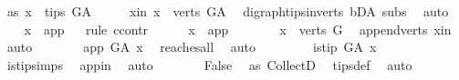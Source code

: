 \begin{isabellebody}
\ as{}{\isacharcolon}{\kern0pt}\ {\isachardoublequoteopen}x\ {\isasymin}\ tips\ G{\isacharunderscore}{\kern0pt}A{\isachardoublequoteclose}\isanewline
\ \ \isamarkupfalse%
\ \isamarkupfalse%
\ x{\isacharunderscore}{\kern0pt}in{\isacharcolon}{\kern0pt}\ {\isachardoublequoteopen}x\ {\isasymin}\ verts\ G{\isacharunderscore}{\kern0pt}A{\isachardoublequoteclose}\ \isamarkupfalse%
\ digraph{\isachardot}{\kern0pt}tips{\isacharunderscore}{\kern0pt}in{\isacharunderscore}{\kern0pt}verts\ bD{\isacharunderscore}{\kern0pt}A\ subs\ \isamarkupfalse%
\ auto\ \isanewline
\ \ \isamarkupfalse%
\ {\isachardoublequoteopen}x\ {\isacharequal}{\kern0pt}\ app{\isachardoublequoteclose}\isanewline
\ \ \isamarkupfalse%
{\isacharparenleft}{\kern0pt}rule\ ccontr{\isacharparenright}{\kern0pt}\isanewline
\ \ \ \ \isamarkupfalse%
\ {\isachardoublequoteopen}x\ {\isasymnoteq}\ app{\isachardoublequoteclose}\isanewline
\ \ \ \ \isamarkupfalse%
\ \isamarkupfalse%
\ {\isachardoublequoteopen}x\ {\isasymin}\ verts\ G{\isachardoublequoteclose}\ \isamarkupfalse%
\ append{\isacharunderscore}{\kern0pt}verts\ x{\isacharunderscore}{\kern0pt}in\ \isamarkupfalse%
\ auto\isanewline
\ \ \ \ \isamarkupfalse%
\ \isamarkupfalse%
\ {\isachardoublequoteopen}app\ {\isasymrightarrow}\isactrlsup {\isacharplus}{\kern0pt}\isactrlbsub G{\isacharunderscore}{\kern0pt}A\isactrlesub \ x{\isachardoublequoteclose}\ \isamarkupfalse%
\ reaches{\isacharunderscore}{\kern0pt}all\ \isamarkupfalse%
\ auto\isanewline
\ \ \ \ \isamarkupfalse%
\ \isamarkupfalse%
\ {\isachardoublequoteopen}{\isasymnot}\ is{\isacharunderscore}{\kern0pt}tip\ G{\isacharunderscore}{\kern0pt}A\ x{\isachardoublequoteclose}\ \ \isamarkupfalse%
\ is{\isacharunderscore}{\kern0pt}tip{\isachardot}{\kern0pt}simps\ \isamarkupfalse%
\ app{\isacharunderscore}{\kern0pt}in\ \isamarkupfalse%
\ auto\isanewline
\ \ \ \ \isamarkupfalse%
\ \isamarkupfalse%
\ {\isachardoublequoteopen}False{\isachardoublequoteclose}\ \isamarkupfalse%
\ as{}\ CollectD\ \isamarkupfalse%
\ tips{\isacharunderscore}{\kern0pt}def\ \isamarkupfalse%
\ auto\isanewline
\ \ \isamarkupfalse%
\isanewline
{}\isamarkupfalse%
%

\end{isabellebody}

